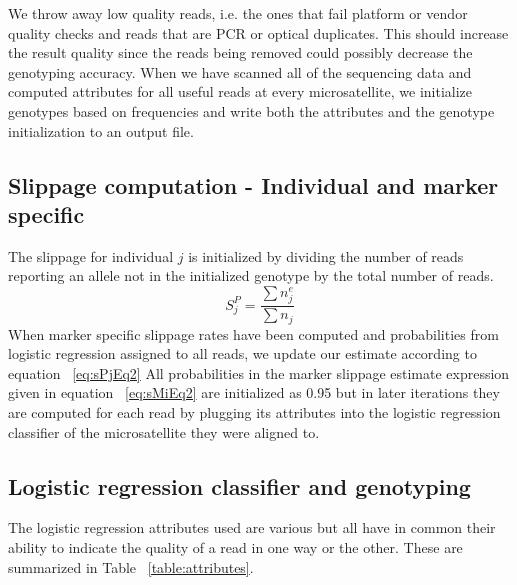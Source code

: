 \documentclass{bioinfo}
\begin{document}
    We throw away low quality reads, i.e. the ones that fail platform or vendor quality checks and reads that are PCR or optical duplicates. This should increase the result quality since the reads being removed could possibly decrease the genotyping accuracy.
    When we have scanned all of the sequencing data and computed attributes for all useful reads at every microsatellite, we initialize genotypes based on frequencies and write both the attributes and the genotype initialization to an output file.
\subsection{Slippage computation - Individual and marker specific}
    The slippage for individual $j$ is initialized by dividing the number of reads reporting an allele not in the initialized genotype by the total number of reads.
    \begin{equation}
            S^{P}_j = \frac{\sum n^e_j}{\sum n_j}
    \end{equation}
    When marker specific slippage rates have been computed and probabilities from logistic regression assigned to all reads, we update our estimate according to equation ~\ref{eq:sPjEq2}
    All probabilities in the marker slippage estimate expression given in equation ~\ref{eq:sMiEq2} are initialized as 0.95 but in later iterations they are computed for each read by plugging its attributes into the logistic regression classifier of the microsatellite they were aligned to.
\subsection{Logistic regression classifier and genotyping}
    The logistic regression attributes used are various but all have in common their ability to indicate the quality of a read in one way or the other. These are summarized in Table ~\ref{table:attributes}. 
\end{document}
